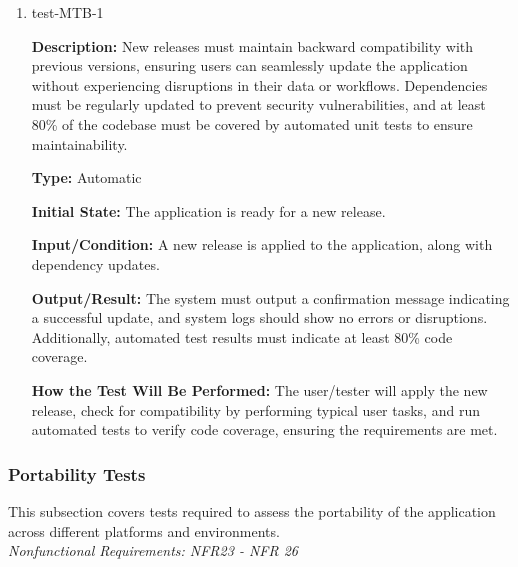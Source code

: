 \documentclass[12pt, titlepage]{article}
\begin{document}
\begin{enumerate}

\item{test-MTB-1\\}

\textbf{Description:} New releases must maintain backward compatibility with previous versions, ensuring users can seamlessly update the application without experiencing disruptions in their data or workflows. Dependencies must be regularly updated to prevent security vulnerabilities, and at least 80\% of the codebase must be covered by automated unit tests to ensure maintainability.

\textbf{Type:} Automatic
					
\textbf{Initial State:} The application is ready for a new release.
					
\textbf{Input/Condition:} A new release is applied to the application, along with dependency updates.
					
\textbf{Output/Result:} The system must output a confirmation message indicating a successful update, and system logs should show no errors or disruptions. Additionally, automated test results must indicate at least 80\% code coverage.
					
\textbf{How the Test Will Be Performed:} The user/tester will apply the new release, check for compatibility by performing typical user tasks, and run automated tests to verify code coverage, ensuring the requirements are met.

\end{enumerate}

\subsubsection{Portability Tests}

This subsection covers tests required to assess the portability of the application across different platforms and environments. \\
\textit{Nonfunctional Requirements: NFR23 - NFR 26}
\end{document}
